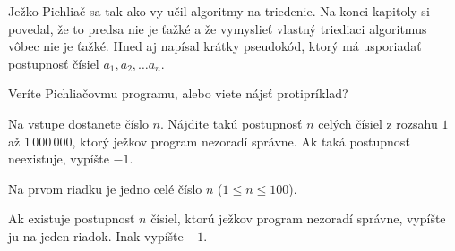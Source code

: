 




Ježko Pichliač sa tak ako vy učil algoritmy na triedenie. Na konci kapitoly si povedal, že to predsa
nie je ťažké a že vymyslieť vlastný triediaci algoritmus vôbec nie je ťažké. Hneď aj napísal krátky
pseudokód, ktorý má usporiadať postupnosť čísiel $a_1, a_2, \dots a_n$.


Veríte Pichliačovmu programu, alebo viete nájsť protipríklad?


Na vstupe dostanete číslo $n$. Nájdite takú postupnosť $n$ celých čísiel z rozsahu $1$ až
$1\,000\,000$, ktorý ježkov program nezoradí správne. Ak taká postupnosť neexistuje, vypíšte $-1$.


Na prvom riadku je jedno celé číslo $n$ ($1 \leq n \leq 100$).


Ak existuje postupnosť $n$ čísiel, ktorú ježkov program nezoradí správne, vypíšte ju na jeden riadok.
Inak vypíšte $-1$.


\koniec


